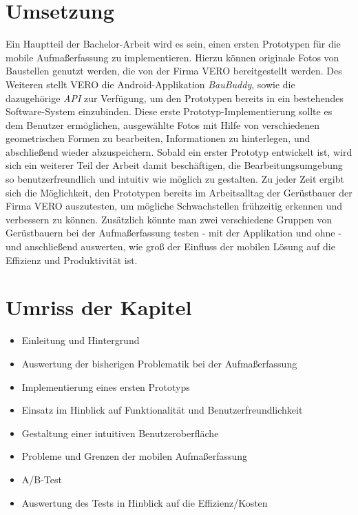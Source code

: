 \documentclass[a4paper]{article}
\begin{document}
\section*{Umsetzung}
Ein Hauptteil der Bachelor-Arbeit wird es sein, einen ersten Prototypen für die mobile Aufmaßerfassung zu implementieren.
Hierzu können originale Fotos von Baustellen genutzt werden, die von der Firma \textsc{VERO} bereitgestellt werden.
Des Weiteren stellt \textsc{VERO} die Android-Applikation \textit{BauBuddy}, sowie die dazugehörige \textit{API} zur Verfügung, um den Prototypen bereits in ein bestehendes Software-System einzubinden.
Diese erste Prototyp-Implementierung sollte es dem Benutzer ermöglichen, ausgewählte Fotos mit Hilfe von verschiedenen geometrischen Formen zu bearbeiten, Informationen zu hinterlegen, und abschließend wieder abzuspeichern.
Sobald ein erster Prototyp entwickelt ist, wird sich ein weiterer Teil der Arbeit damit beschäftigen, die Bearbeitungsumgebung so benutzerfreundlich und intuitiv wie möglich zu gestalten.
Zu jeder Zeit ergibt sich die Möglichkeit, den Prototypen bereits im Arbeitsalltag der Gerüstbauer der Firma \textsc{VERO} auszutesten, um mögliche Schwachstellen frühzeitig erkennen und verbessern zu können.
Zusätzlich könnte man zwei verschiedene Gruppen von Gerüstbauern bei der Aufmaßerfassung testen - mit der Applikation und ohne - und anschließend auswerten, wie groß der Einfluss der mobilen Lösung auf die Effizienz und Produktivität ist.

\section*{Umriss der Kapitel}
\begin{itemize}
	\item Einleitung und Hintergrund
	\item Auswertung der bisherigen Problematik bei der Aufmaßerfassung
	\item Implementierung eines ersten Prototyps
	\item Einsatz im Hinblick auf Funktionalität und Benutzerfreundlichkeit
	\item Gestaltung einer intuitiven Benutzeroberfläche
	\item Probleme und Grenzen der mobilen Aufmaßerfassung
	\item A/B-Test
	\item Auswertung des Tests in Hinblick auf die Effizienz/Kosten
\end{itemize}

\newpage
\end{document}
